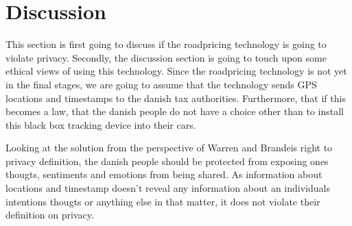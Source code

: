 \section{Discussion}
This section is first going to discuss if the roadpricing technology is going to violate privacy. Secondly, the discussion section is going to touch upon some ethical views of using this technology.
Since the roadpricing technology is not yet in the final stages, we are going to assume that the technology sends GPS locations and timestamps to the danish tax authorities. Furthermore, that if this becomes a law, that the danish people do not have a choice other than to install this black box tracking device into their cars. 

Looking at the solution from the perspective of Warren and Brandeis right to privacy definition, the danish people should be protected from exposing ones thougts, sentiments and emotions from being shared. As information about locations and timestamp doesn't reveal any information about an individuals intentions thougts or anything else in that matter, it does not violate their definition on privacy. 

